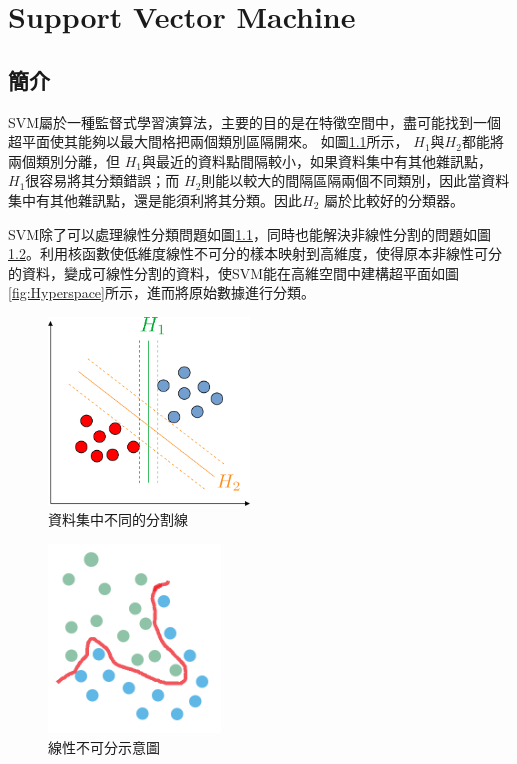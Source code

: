 \chapter{Support Vector Machine }
\label{chapter:SVM}
\section{簡介}

SVM屬於一種監督式學習演算法，主要的目的是在特徵空間中，盡可能找到一個超平面使其能夠以最大間格把兩個類別區隔開來。
如圖\ref{fig:SVMBestSeparte}所示， \(H_1\)與\(H_2\)都能將兩個類別分離，但 \(H_1\)與最近的資料點間隔較小，如果資料集中有其他雜訊點， \(H_1\)很容易將其分類錯誤；而 \(H_2\)則能以較大的間隔區隔兩個不同類別，因此當資料集中有其他雜訊點，還是能須利將其分類。因此\(H_2\) 屬於比較好的分類器。

SVM除了可以處理線性分類問題如圖\ref{fig:SVMBestSeparte}，同時也能解決非線性分割的問題如圖\ref{fig:LinearUnseparable}。利用核函數使低維度線性不可分的樣本映射到高維度，使得原本非線性可分的資料，變成可線性分割的資料，使SVM能在高維空間中建構超平面如圖\ref{fig:Hyperspace}所示，進而將原始數據進行分類。

\begin{figure}[H]
	\centerline{\includegraphics[height=5cm]{./pic/PnmhVqej.png}}
	\caption{資料集中不同的分割線}
	\label{fig:SVMBestSeparte}
\end{figure}

\begin{figure}[H]
	\centerline{\includegraphics[height=5cm]{pic/unlinear.PNG}}
	\caption{線性不可分示意圖}
	\label{fig:LinearUnseparable}
\end{figure}

